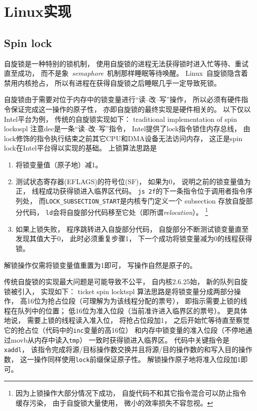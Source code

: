 \section{Linux实现}
\subsection{Spin lock}
自旋锁是一种特别的锁机制，
使用自旋锁的进程无法获得锁时进入忙等待、重试直至成功，
而不是象~{\em semaphore}~机制那样睡眠等待唤醒。
Linux~自旋锁隐含着禁用内核抢占，
所以有进程在获得自旋锁之后睡眠几乎一定导致死锁。

自旋锁由于需要对位于内存中的锁变量进行``读--改--写''操作，
所以必须有硬件指令保证完成这一操作的原子性，
亦即自旋锁的最终实现是硬件相关的。
以下仅以Intel平台为例，
传统的自旋锁实现如下：
              {traditional implementation of spin lock}{ospl}
注意dec是一条``读--改--写''指令，
Intel提供了lock指令锁住内存总线，
由lock修饰的指令执行结束之前其它CPU和DMA设备无法访问内存，
这正是spin lock在Intel平台得以实现的基础。
上锁算法思路是
\begin{enumerate}
  \item 将锁变量值（原子地）减1。
  \item 测试状态寄存器(EFLAGS)的符号位(SF)，
        如果为0，
        说明之前的锁变量值为正，
        线程成功获得锁进入临界区代码。
        \verb|js 2f|的下一条指令位于调用者指令序列处，
        而\verb|LOCK_SUBSECTION_START|是内核专门定义一个 subsection 存放自旋部分代码，
        \verb|ld|会将自旋部分代码移至它处（即所谓{\em relocation}）。
        \footnote{
        因为上锁操作大部分情况下成功，
        自旋代码不和其它指令混合可以防止指令缓存污染，
        由于自旋锁大量使用，
        微小的效率损失不容忽视。}
  \item 如果上锁失败，
        程序跳转进入自旋部分代码，
        自旋部分不断测试锁变量直至发现其值大于0，
        此时必须重复步骤1，
        下一个成功将锁变量减为0的线程获得锁。
\end{enumerate}

解锁操作仅需将锁变量值重置为1即可，
写操作自然是原子的。

传统自旋锁的实现最大问题是可能导致不公平，
自内核2.6.25始，
新的队列自旋锁被引入，
实现如下：
              {ticket spin lock}{tspl}
算法思路是将锁变量分成两部分操作，
高16位为抢占位段（可理解为为该线程分配的票号），
即指示需要上锁的线程在队列中的位置；
低16位为准入位段（当前准许进入临界区的票号）。
更具体地说，
需要上锁的线程读入准入位，
将抢占位段加1，
之后开始忙等待直至察觉它的抢占位（代码中的\verb|inc|变量的高16位）%
和内存中锁变量的准入位段（不停地通过movb从内存中读入\verb|tmp|）%
一致时获得锁进入临界区。
代码中关键指令是\verb|xaddl|，
该指令完成将源/目标操作数交换并且将源/目的操作数的和写入目的操作数，
这一操作同样使用\verb|lock|前缀保证原子性。
解锁操作原子地将准入位段加1即可。

